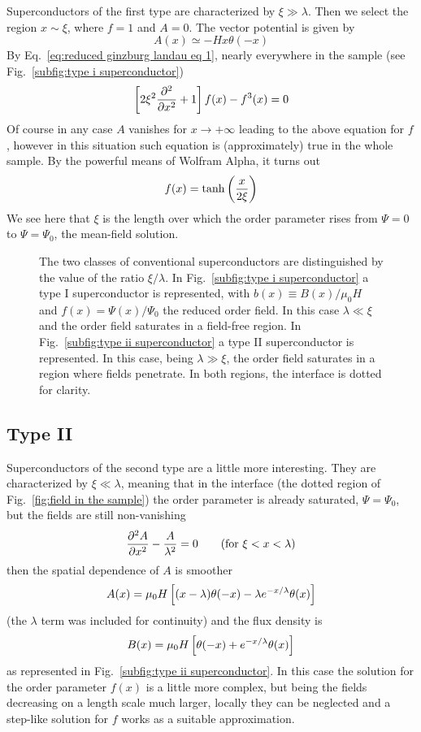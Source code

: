 Superconductors of the first type are characterized by $\xi \gg \lambda$. Then we select the region $x \sim \xi$, where $f=1$ and $A=0$. The vector potential is given by
\[
    A(x) \simeq -Hx \theta (-x)
\]
By Eq.~\eqref{eq:reduced ginzburg landau eq 1}, nearly everywhere in the sample (see Fig.~\ref{subfig:type i superconductor})
\[
    \left[{ 2\xi^2 \pdv[2]{}{x} + 1 }\right] f(x) - f^3 (x) = 0
\]
Of course in any case $A$ vanishes for $x\to +\infty$ leading to the above equation for $f$, however in this situation such equation is (approximately) true in the whole sample. By the powerful means of Wolfram Alpha\textregistered, it turns out
\[
    f(x) = \tanh\left({\frac{x}{2\xi}}\right)
\]
We see here that $\xi$ is the length over which the order parameter rises from $\Psi=0$ to $\Psi=\Psi_0$, the mean-field solution.

\begin{figure}
    \centering
    \caption{The two classes of conventional superconductors are distinguished by the value of the ratio $\xi/\lambda$. In Fig.~\ref{subfig:type i superconductor} a type I superconductor is represented, with $b(x) \equiv B(x)/\mu_0 H$ and $f(x)=\Psi(x)/\Psi_0$ the reduced order field. In this case $\lambda \ll \xi$ and the order field saturates in a field-free region. In Fig.~\ref{subfig:type ii superconductor} a type II superconductor is represented. In this case, being $\lambda \gg \xi$, the order field saturates in a region where fields penetrate. In both regions, the interface is dotted for clarity.}
    \label{fig:type i type ii superconductor}
\end{figure}

\subsection{Type II}

Superconductors of the second type are a little more interesting. They are characterized by $\xi \ll \lambda$, meaning that in the interface (the dotted region of Fig.~\ref{fig:field in the sample}) the order parameter is already saturated, $\Psi=\Psi_0$, but the fields are still non-vanishing  
\[
    \pdv[2]{A}{x} - \frac{A}{\lambda^2} = 0
    \qquad\text{(for $\xi < x < \lambda$)}
\]
then the spatial dependence of $A$ is smoother
\[
    A(x) = \mu_0 H \left[{(x-\lambda) \theta(-x) - \lambda e^{-x/\lambda} \theta(x)}\right]
\]
(the $\lambda$ term was included for continuity) and the flux density is
\[
    B(x) = \mu_0 H \left[{\theta(-x) + e^{-x/\lambda} \theta(x)}\right]
\]
as represented in Fig.~\ref{subfig:type ii superconductor}. In this case the solution for the order parameter $f(x)$ is a little more complex, but being the fields decreasing on a length scale much larger, locally they can be neglected and a step-like solution for $f$ works as a suitable approximation.

